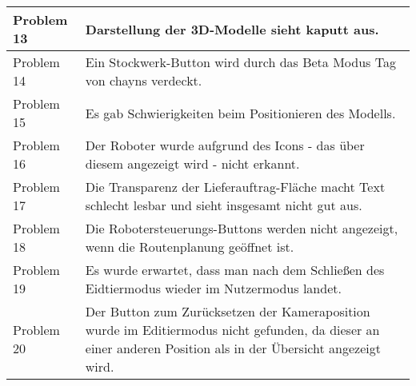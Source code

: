 \begin{table}[H]
\begin{tabular}{|l|l|}
        Problem 13  & \multicolumn{1}{p{12cm}|}{Darstellung der 3D-Modelle sieht kaputt aus.} \\ \hline
        Problem 14  & \multicolumn{1}{p{12cm}|}{Ein Stockwerk-Button wird durch das Beta Modus Tag von chayns verdeckt.} \\ \hline
        Problem 15  & \multicolumn{1}{p{12cm}|}{Es gab Schwierigkeiten beim Positionieren des Modells.} \\ \hline
        Problem 16  & \multicolumn{1}{p{12cm}|}{Der Roboter wurde aufgrund des Icons - das über diesem angezeigt wird - nicht erkannt.} \\ \hline
        Problem 17  & \multicolumn{1}{p{12cm}|}{Die Transparenz der Lieferauftrag-Fläche macht Text schlecht lesbar und sieht insgesamt nicht gut aus.} \\ \hline
        Problem 18  & \multicolumn{1}{p{12cm}|}{Die Robotersteuerungs-Buttons werden nicht angezeigt, wenn die Routenplanung geöffnet ist.} \\ \hline
        Problem 19  & \multicolumn{1}{p{12cm}|}{Es wurde erwartet, dass man nach dem Schließen des Eidtiermodus wieder im Nutzermodus landet.} \\ \hline
        Problem 20  & \multicolumn{1}{p{12cm}|}{Der Button zum Zurücksetzen der Kameraposition wurde im Editiermodus nicht gefunden, da dieser an einer anderen Position als in der Übersicht angezeigt wird.} \\ \hline
    \end{tabular}
\end{table}
